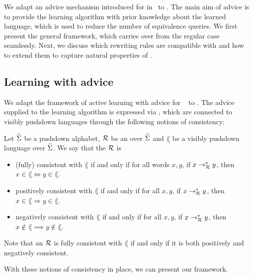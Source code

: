 We adapt an advice mechanism introduced for \DFA in~\cite{ecai25} to \DVPA. 
The main aim of advice is to 
provide the learning algorithm with prior knowledge about the learned language, which is used to reduce the number of equivalence queries.
We first present the general framework, which carries over from the regular case seamlessly.
Next, we discuss which rewriting rules are compatible with \VPLs and how to extend them to capture natural 
properties of \VPLs.

\subsection{Learning with advice}
We adapt the framework of active learning with advice for \DFA~\cite{ecai25} to \DVPA. 
The advice supplied to the learning  algorithm is expressed via \SRSs, 
which are connected to visibly pushdown languages through the following notions of consistency: 


\begin{definition}
\label{def:consistent}
Let $\widehat{\Sigma}$ be a pushdown alphabet, $\mathcal{R}$ be an \SRS over $\widehat{\Sigma}$ and $\lang$ be a visibly pushdown language over $\widehat{\Sigma}$. 
We say that the \SRS $\mathcal{R}$ is
\begin{itemize}
\item {(fully) consistent} with $\lang$ if and only if
for all words $x,y$, if $x \rightarrow^*_{\mathcal{R}} y$, then $x \in \lang \Leftrightarrow y \in \lang$.  
\item {positively consistent} with $\lang$ if and only if for all  $x,y$, if $x \rightarrow^*_{\mathcal{R}} y$,
then $x \in \lang \Rightarrow y \in \lang$.
\item {negatively consistent} with $\lang$ if and only if for all  $x,y$, if $x \rightarrow^*_{\mathcal{R}} y$, then $x \notin \lang \implies y \notin \lang$.  
\end{itemize}
\end{definition}

Note that an \SRS $\mathcal{R}$ is fully consistent with $\lang$ if and only if it is both positively and negatively consistent.

With these notions of consistency in place, we can present our framework.

